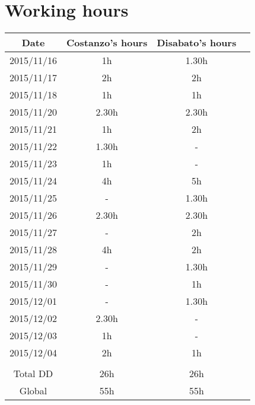 \documentclass[\mainpath/main]{subfiles}
\begin{document}
\section{Working hours}
\begin{table}[h!]
	\centering
\begin{tabular}{cccc}
\hline
Date       & Costanzo's hours & Disabato's hours  & \\ \hline
2015/11/16 & 1h 			  & 1.30h 			  & \\ \hline
2015/11/17 & 2h 			  & 2h 				  & \\ \hline 
2015/11/18 & 1h 			  & 1h 				  & \\ \hline
2015/11/20 & 2.30h 			  & 2.30h 			  & \\ \hline
2015/11/21 & 1h 			  & 2h 				  & \\ \hline
2015/11/22 & 1.30h 			  & - 				  & \\ \hline
2015/11/23 & 1h				  & -                 & \\ \hline
2015/11/24 & 4h				  & 5h				  & \\ \hline
2015/11/25 & -				  & 1.30h			  & \\ \hline
2015/11/26 & 2.30h			  & 2.30h			  & \\ \hline
2015/11/27 & -				  & 2h				  & \\ \hline
2015/11/28 & 4h				  & 2h				  & \\ \hline
2015/11/29 & -				  & 1.30h			  & \\ \hline
2015/11/30 & -                & 1h 				  & \\ \hline
2015/12/01 & -                & 1.30h             & \\ \hline
2015/12/02 & 2.30h            & -                 & \\ \hline
2015/12/03 & 1h	              & -                 & \\ \hline
2015/12/04 & 2h               & 1h                & \\ \hline
\\
Total DD   & 26h 		      & 26h 			  & \\ \hline
Global 	   & 55h 		      & 55h 			  & \\ \hline

\end{tabular}
\end{table}
\end{document}
